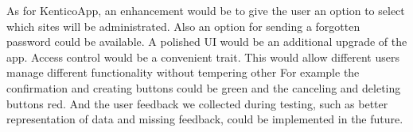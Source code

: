 As for KenticoApp, an enhancement would be to give the user an option to select which sites will be administrated. Also an option for sending a forgotten password could be available. A polished UI would be an additional upgrade of the app. Access control would be a convenient trait. This would allow different users manage different functionality without tempering other
For example the confirmation and creating buttons could be green and the canceling and deleting buttons red. And the user feedback we collected during testing, such as better representation of data and missing feedback, could be implemented in the future.
